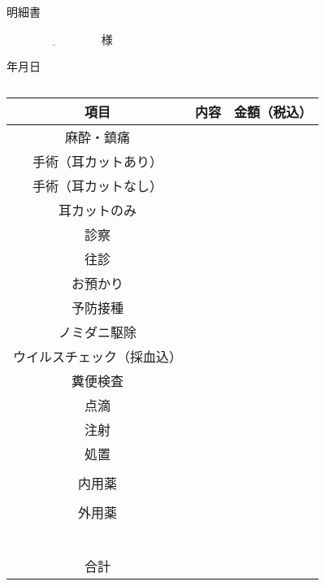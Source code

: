 \documentclass[b6paper]{jsarticle}
\begin{document}
\begin{center}
\Large
明細書
\end{center}

\large
$\underline{\hspace{100pt}}$様

\begin{flushright}
\normalsize
\vspace{-23pt}
年\hspace{20pt}月\hspace{20pt}日
\end{flushright}
\vspace{-40pt}
\begin{table}[htbp]
	\captionsetup{labelformat=empty,labelsep=none}
	\caption{}
	\label{}
	\begin{center}
	\small
	\begin{tabular}{c|c|c}  \toprule
	項目 & 内容 & 金額（税込）  \\ \hline
	麻酔・鎮痛 & \hspace{100pt} & \\
	手術（耳カットあり） &  & \\
	手術（耳カットなし） &  & \\
	耳カットのみ &  & \\
	診察 &  & \\
	往診 &  & \\
	お預かり &  & \\
	予防接種 &  & \\
	ノミダニ駆除 &  & \\
	ウイルスチェック（採血込） &  & \\
	糞便検査 &  & \\
	点滴 &  & \\
	注射 &  & \\
	処置 &  & \\
	 &  & \\
	内用薬 &  & \\
	 &  & \\
	外用薬 &  & \\
	 &  & \\
	 &  & \\
	 &  & \\
	 &  & \\
	 &  & \\
	 &  & \\
	合計 &  & \\  \bottomrule
	 \end{tabular}
	 \end{center}
\end{table}
\small
\end{document}
